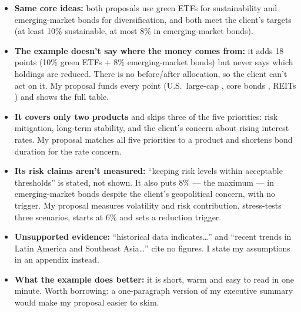 \documentclass[11pt]{article}
\begin{document}
\begin{itemize}[leftmargin=1.5em, itemsep=3pt]
  \item \textbf{Same core ideas:} both proposals use green ETFs for
  sustainability and emerging-market bonds for diversification, and both
  meet the client's targets (at least 10\% sustainable, at most 8\% in
  emerging-market bonds).
  \item \textbf{The example doesn't say where the money comes from:} it adds
  18 points (10\% green ETFs + 8\% emerging-market bonds) but never says which
  holdings are reduced. There is no before/after allocation, so the client
  can't act on it. My proposal funds every point (U.S.\ large-cap
  , core bonds , REITs ) and shows the full
  table.
  \item \textbf{It covers only two products} and skips three of the five
  priorities: risk mitigation, long-term stability, and the client's concern
  about rising interest rates. My proposal matches all five priorities to a
  product and shortens bond duration for the rate concern.
  \item \textbf{Its risk claims aren't measured:} ``keeping risk levels
  within acceptable thresholds'' is stated, not shown. It also puts 8\% ---
  the maximum --- in emerging-market bonds despite the client's geopolitical
  concern, with no trigger. My proposal measures volatility and risk
  contribution, stress-tests three scenarios, starts at 6\% and sets a
  reduction trigger.
  \item \textbf{Unsupported evidence:} ``historical data indicates\ldots'' and
  ``recent trends in Latin America and Southeast Asia\ldots'' cite no
  figures. I state my assumptions in an appendix instead.
  \item \textbf{What the example does better:} it is short, warm and easy to
  read in one minute. Worth borrowing: a one-paragraph version of my
  executive summary would make my proposal easier to skim.
\end{itemize}
\end{document}

